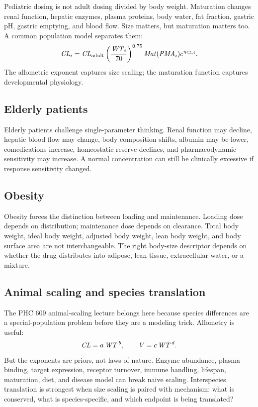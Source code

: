 \documentclass[a4paper]{article}
\newcommand{\pkCL}{\pksym{CL}}
\newcommand{\pkV}{\pksym{V}}
\begin{document}
Pediatric dosing is not adult dosing divided by body weight. Maturation changes renal function, hepatic enzymes, plasma proteins, body water, fat fraction, gastric pH, gastric emptying, and blood flow. Size matters, but maturation matters too. A common population model separates them:
\[
  \pkCL_i
  =
  \pkCL_{\pklab{adult}}
  \left(\frac{\pksym{WT}_i}{70}\right)^{0.75}
  \pksym{Mat}(\pksym{PMA}_i)
  e^{\eta_{\pkCL,i}}.
\]
The allometric exponent captures size scaling; the maturation function captures developmental physiology.

\subsection{Elderly patients}

Elderly patients challenge single-parameter thinking. Renal function may decline, hepatic blood flow may change, body composition shifts, albumin may be lower, comedications increase, homeostatic reserve declines, and pharmacodynamic sensitivity may increase. A normal concentration can still be clinically excessive if response sensitivity changed.

\subsection{Obesity}

Obesity forces the distinction between loading and maintenance. Loading dose depends on distribution; maintenance dose depends on clearance. Total body weight, ideal body weight, adjusted body weight, lean body weight, and body surface area are not interchangeable. The right body-size descriptor depends on whether the drug distributes into adipose, lean tissue, extracellular water, or a mixture.

\subsection{Animal scaling and species translation}

The PHC 609 animal-scaling lecture belongs here because species differences are a special-population problem before they are a modeling trick. Allometry is useful:
\[
  \pkCL = a\,\pksym{WT}^{\,b},
  \qquad
  \pkV = c\,\pksym{WT}^{\,d}.
\]
But the exponents are priors, not laws of nature. Enzyme abundance, plasma binding, target expression, receptor turnover, immune handling, lifespan, maturation, diet, and disease model can break naive scaling. Interspecies translation is strongest when size scaling is paired with mechanism: what is conserved, what is species-specific, and which endpoint is being translated?
\end{document}
